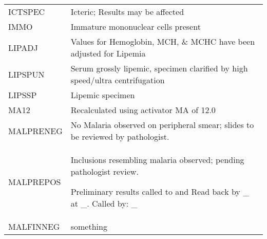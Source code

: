 \begin{fullwidth}
\begin{longtable}{p{.20\linewidth} p{.75\linewidth}}
ICTSPEC     & Icteric; Results may be affected                                                                                                                                                                                                                                                             \\
IMMO        & Immature mononuclear cells present                                                                                                                                                                                                                                                           \\
LIPADJ      & Values for Hemoglobin, MCH, \& MCHC have been adjusted for Lipemia                                                                                                                                                                                                                           \\
LIPSPUN     & Serum grossly lipemic, specimen clarified by high speed/ultra centrifugation                                                                                                                                                                                                                 \\
LIPSSP      & Lipemic specimen                                                                                                                                                                                                                                                                             \\
MA12        & Recalculated using activator MA of 12.0                                                                                                                                                                                                                                                      \\

MALPRENEG & No Malaria observed on peripheral smear; slides to be reviewed by pathologist.\\
MALPREPOS & Inclusions resembling malaria observed; pending pathologist review.

            Preliminary results called to and Read back by \_ at \_. Called by: \_ \\
MALFINNEG & something \\


\end{longtable}
\end{fullwidth}
